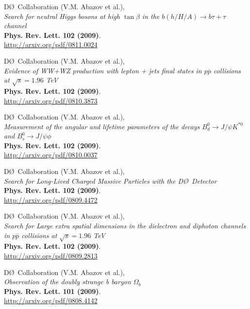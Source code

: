 \documentclass[12pt]{article}
\begin{document}
%
D\O~Collaboration (V.M. Abazov et al.), \\
\textsl{Search for neutral Higgs bosons at high $\tan\beta$ in the $b(h/H/A)\rightarrow b\tau+\tau$ channel}\\
\textbf{Phys. Rev. Lett. 102 (2009)}.\\
{\small{\url{http://arxiv.org/pdf/0811.0024}}}\vspace{4mm}

%
D\O~Collaboration (V.M. Abazov et al.), \\
\textsl{ Evidence of WW+WZ production with lepton + jets final states in $p\overline{p}$ collisions at $\sqrt{s}=1.96$ TeV}\\
\textbf{Phys. Rev. Lett. 102 (2009)}.\\
{\small{\url{http://arxiv.org/pdf/0810.3873}}}\vspace{4mm}

%
D\O~Collaboration (V.M. Abazov et al.), \\
\textsl{Measurement of the angular and lifetime parameters of the decays $B^0_d\rightarrow J/\psi K^{*0}$ and $B^0_s\rightarrow J/\psi \phi$ }\\
\textbf{Phys. Rev. Lett. 102 (2009)}.\\
{\small{\url{http://arxiv.org/pdf/0810.0037}}}\vspace{4mm}

%
D\O~Collaboration (V.M. Abazov et al.), \\
\textsl{Search for Long-Lived Charged Massive Particles with the D\O~Detector}\\
\textbf{Phys. Rev. Lett. 102 (2009)}.\\
{\small{\url{http://arxiv.org/pdf/0809.4472}}}\vspace{4mm}

%
D\O~Collaboration (V.M. Abazov et al.), \\
\textsl{Search for Large extra spatial dimensions in the dielectron and diphoton channels in $p\overline{p}$ collisions at $\sqrt{s}=1.96$ TeV}\\
\textbf{Phys. Rev. Lett. 102 (2009)}.\\
{\small{\url{http://arxiv.org/pdf/0809.2813}}}\vspace{4mm}

%
D\O~Collaboration (V.M. Abazov et al.), \\
\textsl{Observation of the doubly strange b baryon $\Omega_b$}\\
\textbf{Phys. Rev. Lett. 101 (2009)}.\\
{\small{\url{http://arxiv.org/pdf/0808.4142}}}\vspace{4mm}
\end{document}
